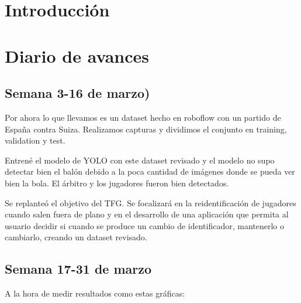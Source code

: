 \documentclass[12pt, a4paper, twoside]{article}
\begin{document}
	
	
	
	\clearpage
	\setcounter{page}{1}
	
	
	
	\tableofcontents
	\newpage
	
	
	\section{Introducción}
	
	\section{Diario de avances}
	
	\subsection{Semana 3-16 de marzo)}
	
	Por ahora lo que llevamos es un dataset hecho en roboflow con un partido de España contra Suiza. Realizamos capturas y dividimos el conjunto en training, validation y test.
	
	Entrené el modelo de YOLO con este dataset revisado y el modelo no supo detectar bien el balón debido a la poca cantidad de imágenes donde se pueda ver bien la bola. El árbitro y los jugadores fueron bien detectados.
	
	Se replanteó el objetivo del TFG. Se focalizará en la reidentificación de jugadores cuando salen fuera de plano y en el desarrollo de una aplicación que permita al usuario decidir si cuando se produce un cambio de identificador, mantenerlo o cambiarlo, creando un dataset revisado.
	
	\subsection{Semana 17-31 de marzo \cite{gta-link}}
	
	A la hora de medir resultados como estas gráficas:
	
\end{document}
